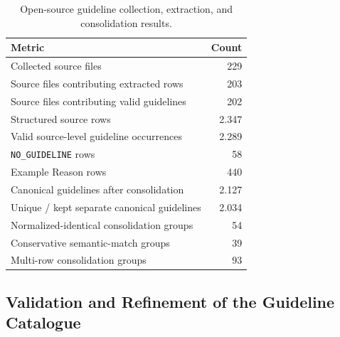 \begin{table}[H]
    \centering

    \begin{tabularx}{\textwidth}{X r}
        \toprule
        \textbf{Metric} & \textbf{Count} \\
        \midrule
        Collected source files & 229 \\
        Source files contributing extracted rows & 203 \\
        Source files contributing valid guidelines & 202 \\
        Structured source rows & 2.347 \\
        Valid source-level guideline occurrences & 2.289 \\
        \texttt{NO\_GUIDELINE} rows & 58 \\
        Example Reason rows & 440 \\
        Canonical guidelines after consolidation & 2.127 \\
        Unique / kept separate canonical guidelines & 2.034 \\
        Normalized-identical consolidation groups & 54 \\
        Conservative semantic-match groups & 39 \\
        Multi-row consolidation groups & 93 \\
        \bottomrule
    \end{tabularx}

    \caption{Open-source guideline collection, extraction, and consolidation
    results.}
    \label{tab:oss-guideline-summary}
\end{table}

\subsection{Validation and Refinement of the Guideline Catalogue}

